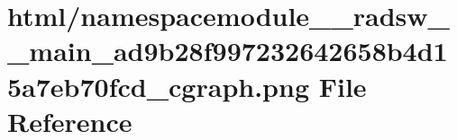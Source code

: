 \hypertarget{namespacemodule____radsw____main__ad9b28f997232642658b4d15a7eb70fcd__cgraph_8png}{}\section{html/namespacemodule\+\_\+\+\_\+radsw\+\_\+\+\_\+main\+\_\+ad9b28f997232642658b4d15a7eb70fcd\+\_\+cgraph.png File Reference}
\label{namespacemodule____radsw____main__ad9b28f997232642658b4d15a7eb70fcd__cgraph_8png}
